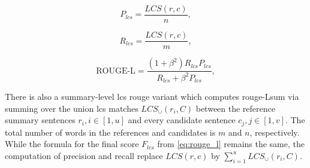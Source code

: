 \begin{equation}
P_{lcs} = \frac{LCS(r,c)}{n},
\label{eq:rouge_l_precision}
\end{equation}

\begin{equation}
R_{lcs} = \frac{LCS(r,c)}{m},
\label{eq:rouge_l_recall}
\end{equation}

\begin{equation}
\text{ROUGE-L} = \frac{(1 + \beta^2)R_{lcs}P_{lcs}}{R_{lcs} + \beta^2 P_{lcs}},
\label{eq:rouge_l}
\end{equation}

There is also a summary-level \ac{lcs} \ac{rouge} variant which computes \ac{rouge}-Lsum via summing over the union \ac{lcs} matches $LCS_\cup(r_i,C)$ between the reference summary sentences $r_i, i \in [1,u]$ and every candidate sentence $c_j, j \in [1,v]$.
The total number of words in the references and candidates is $m$ and $n$, respectively.
While the formula for the final score $F_{lcs}$ from \autoref{eq:rouge_l} remains the same, the computation of precision and recall replace $LCS(r,c)$ by $\sum_{i=1}^{u}LCS_\cup(r_i,C)$.
